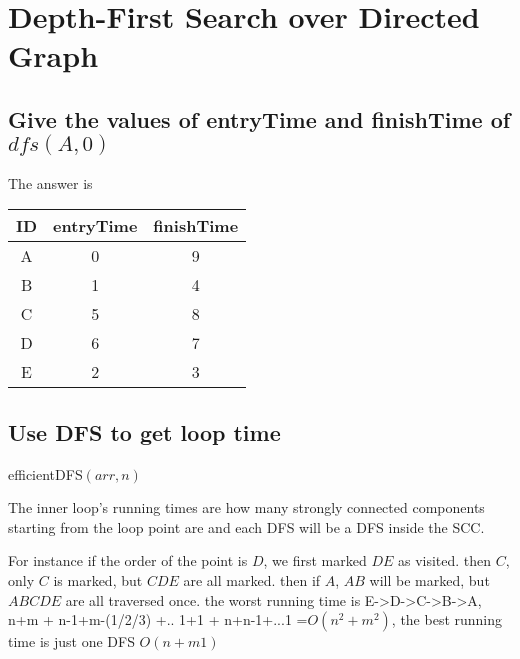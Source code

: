 \documentclass[a4paper]{article}
\begin{document}
\section{Depth-First Search over Directed Graph}
\subsection{Give the values of entryTime and finishTime of $dfs(A, 0)$}
The answer is

\begin{center}
  \begin{tabular}{ |c|c|c| }
    \hline
    ID & entryTime & finishTime \\ \hline
    A  & 0         & 9          \\
    B  & 1         & 4          \\
    C  & 5         & 8          \\
    D  & 6         & 7          \\
    E  & 2         & 3          \\
    \hline
  \end{tabular}
\end{center}

\subsection{Use DFS to get loop time}
\begin{algorithm}
  \caption{efficientDFS$(arr,n)$}\label{alg:cap4}
  \begin{algorithmic}[1]
    \EndFor
    \EndIf
    \EndWhile
  \end{algorithmic}
\end{algorithm}

The inner loop's running times are how many strongly connected components starting from the loop point are and each DFS will be a DFS inside the SCC.

For instance if the order of the point is $D$, we first marked $DE$ as visited. then $C$, only $C$ is marked, but $CDE$ are all marked. then if $A$, $AB$ will be marked, but $ABCDE$ are all traversed once. the worst running time is E->D->C->B->A, n+m + n-1+m-(1/2/3) +.. 1+1 + n+n-1+...1 =$O(n^2+m^2)$, the best running time is just one DFS $O(n+m1)$
\end{document}

